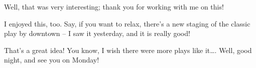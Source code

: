\heroSTUDENT{} Well, that was very interesting; thank you for working with me
on this!

\heroADVISOR{} I enjoyed this, too. Say, if you want to relax, there's a new
staging of the classic play by \citet{fischer2010play} downtown -- I saw
it yesterday, and it is really good!

\heroSTUDENT{} That's a great idea! You know, I wish there were more plays
like it\ldots{}. Well, good night, and see you on Monday!


